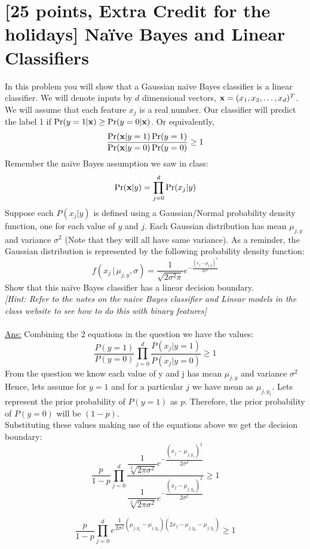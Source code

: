 \section{[25 points, Extra Credit for the holidays] Na\"ive Bayes and Linear Classifiers }
\label{sec:q1}


In this problem you will show that a Gaussian na\"ive Bayes classifier is a linear classifier. We will denote inputs by $d$ dimensional vectors, ${\bf x} = (x_1, x_2,\dots, x_d)^T$. We will assume that each feature $x_j$ is a real number. Our classifier will predict the label 1 if $\Pr(y=1|{\bf x}) \geq \Pr(y=0|{\bf x})$. Or equivalently,
\[\frac{\Pr({\bf x} | y=1)\Pr(y=1)}{\Pr({\bf x} | y=0)\Pr(y=0)} \geq 1\]
Remember the na\"ive Bayes assumption we saw in class:
\[\Pr({\bf x}|y) = \prod_{j=0}^{d}\Pr(x_j|y)\]
Suppose each $P(x_j|y)$ is defined using a Gaussian/Normal probability density function, one for each value of $y$ and $j$. Each Gaussian distribution has mean $\mu_{j,y}$ and variance $\sigma^2$ (Note that they will all have same variance). As a reminder, the Gaussian distribution is represented by the following probability density function:
\[f(x_j\,|\,\mu_{j,y}, \sigma) = \frac{1}{\sqrt{2\sigma^2\pi}}e^{-\frac{(x_j-\mu_{j,y})^2}{2\sigma^2}}\]
Show that this na\"ive Bayes classifier has a linear decision boundary.\\ \textit{[Hint: Refer to the notes on the naive Bayes classifier and Linear models in the class website to see how to do this with binary features]}\\\\
\underline{Ans:} Combining the 2 equations in the question we have the values:
\[\dfrac{P(y=1)}{P(y=0)}\prod_{j=0}^d \dfrac{P(x_j|y=1)}{P(x_j|y=0)} \ge 1\]
From the question we know each value of y and j has mean $\mu_{j,y}$ and variance $\sigma^2$\\
Hence, lets assume for $y=1$ and for a particular $j$ we have mean as $\mu_{j,y_1}$. Lets represent the prior probability of $P(y=1)$ as $p$. Therefore, the prior probability of $P(y=0)$ will be $(1-p)$.\\
Substituting these values making use of the equations above we get the decision boundary:\\
\[\frac{p}{1-p} \prod_{j=0}^d \dfrac{\dfrac{1}{\sqrt[2]{2\pi \sigma^2}}e^{-\dfrac{(x_j - \mu_{j,y_1})^2}{2\sigma^2}}}{\dfrac{1}{\sqrt[2]{2\pi \sigma^2}}e^{-\dfrac{(x_j - \mu_{j,y_0})^2}{2\sigma^2}}} \ge 1 \]

\[\frac{p}{1-p} \prod_{j=0}^d e^{\dfrac{1}{2\sigma^2}(\mu_{j,y_1} - \mu_{j,y_0})(2x_j - \mu_{j,y_0} - \mu_{j,y_1})} \ge 1\]

